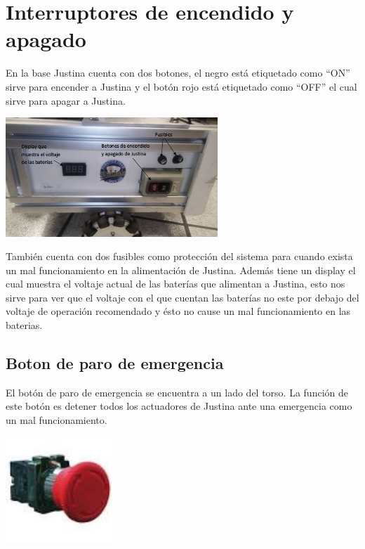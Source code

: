 \documentclass[user_manual.tex]{subfiles}
\begin{document}
\section{Interruptores de encendido y apagado}

En la base Justina cuenta con dos botones, el negro está etiquetado como ``ON'' sirve para encender a Justina y el botón
rojo está etiquetado como ``OFF'' el cual sirve para apagar a Justina.\\

\begin{center}
\includegraphics[width=0.6\textwidth]{Figures/Hardware/Diagramas/Encendido.png}
\label{fig:Hardware:Diagramas:Justina:Encendido}
\end{center}

También cuenta con dos fusibles como protección del sistema para cuando exista un mal funcionamiento en la alimentación de 
Justina. Además tiene un display el cual muestra el voltaje actual de las baterías que alimentan a Justina, esto nos sirve
para ver que el voltaje con el que cuentan las baterías no este por debajo del voltaje de operación recomendado y ésto no cause un mal funcionamiento en las baterias.

\subsection{Boton de paro de emergencia}
El botón de paro de emergencia se encuentra a un lado del torso. La función de este botón es 
detener todos los actuadores de Justina ante una emergencia como un mal funcionamiento.
\begin{center}
\includegraphics[width=0.3\textwidth]{Figures/Hardware/Partes/RBES.jpg}
\label{fig:Hardware:Partes:Paro:Boton}
\end{center}
\end{document}
